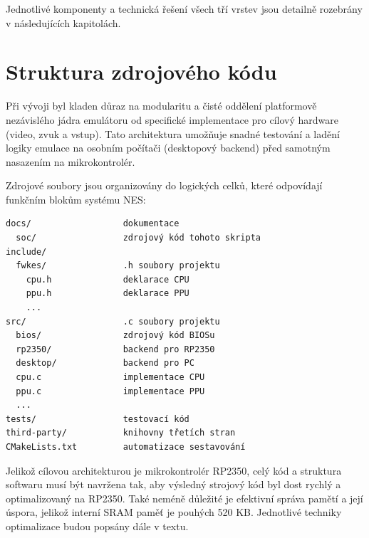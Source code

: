 Jednotlivé komponenty a technická řešení všech tří vrstev jsou detailně rozebrány v následujících
kapitolách.

\chapter{Struktura zdrojového kódu}

Při vývoji byl kladen důraz na modularitu a čisté oddělení platformově nezávislého jádra emulátoru
od specifické implementace pro cílový hardware (video, zvuk a vstup). Tato architektura umožňuje
snadné testování a ladění logiky emulace na osobním počítači (desktopový backend) před samotným
nasazením na mikrokontrolér.

Zdrojové soubory jsou organizovány do logických celků, které odpovídají funkčním blokům systému NES:

\begin{listing}[htbp]
\begin{verbatim}
docs/                  dokumentace
  soc/                 zdrojový kód tohoto skripta
include/
  fwkes/               .h soubory projektu
    cpu.h              deklarace CPU
    ppu.h              deklarace PPU
    ...
src/                   .c soubory projektu
  bios/                zdrojový kód BIOSu
  rp2350/              backend pro RP2350
  desktop/             backend pro PC
  cpu.c                implementace CPU
  ppu.c                implementace PPU
  ...
tests/                 testovací kód
third-party/           knihovny třetích stran
CMakeLists.txt         automatizace sestavování
\end{verbatim}
\caption*{Organizace zdrojového kódu projektu.}
\label{lst:src_code}
\end{listing}

Jelikož cílovou architekturou je mikrokontrolér RP2350, celý kód a struktura softwaru musí být
navržena tak, aby výsledný strojový kód byl dost rychlý a optimalizovaný na RP2350. Také neméně
důležité je efektivní správa pamětí a její úspora, jelikož interní SRAM paměť je pouhých 520 KB.
Jednotlivé techniky optimalizace budou popsány dále v textu.

